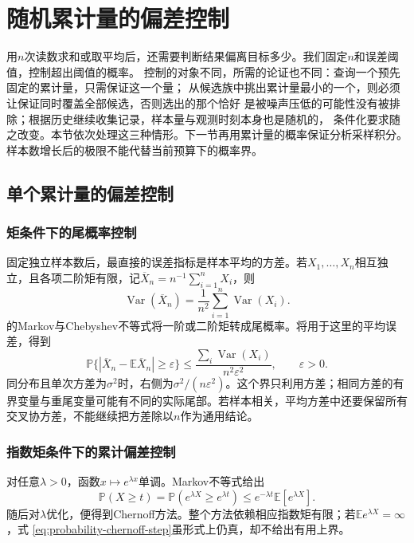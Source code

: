 \section{随机累计量的偏差控制}
\label{sec:probability-averages-errors}
\label{sec:rv-aggregation}
用\(n\)次读数求和或取平均后，还需要判断结果偏离目标多少。我们固定\(n\)和误差阈值，控制超出阈值的概率。
控制的对象不同，所需的论证也不同：查询一个预先固定的累计量，只需保证这一个量；
从候选族中挑出累计量最小的一个，则必须让保证同时覆盖全部候选，否则选出的那个恰好
是被噪声压低的可能性没有被排除；根据历史继续收集记录，样本量与观测时刻本身也是随机的，
条件化要求随之改变。本节依次处理这三种情形。下一节再用累计量的概率保证分析采样积分。
样本数增长后的极限不能代替当前预算下的概率界。

\subsection{单个累计量的偏差控制}
\label{sec:probability-basic-tail-bounds}
\label{sec:probability-concentration-inequalities}
\subsubsection{矩条件下的尾概率控制}
固定独立样本数后，最直接的误差指标是样本平均的方差。若\(X_1,\ldots,X_n\)相互独立，且各项二阶矩有限，记\(\overline X_n=n^{-1}\sum_{i=1}^nX_i\)，则
\[
 \operatorname{Var}(\overline X_n)
 =\frac1{n^2}\sum_{i=1}^n\operatorname{Var}(X_i).
\]
的Markov与Chebyshev不等式将一阶或二阶矩转成尾概率。将用于这里的平均误差，得到
\[
 \mathbb P\{|\overline X_n-\mathbb E\overline X_n|\geq\varepsilon\}
 \leq\frac{\sum_i\operatorname{Var}(X_i)}{n^2\varepsilon^2},
 \qquad\varepsilon>0.
\]
同分布且单次方差为\(\sigma^2\)时，右侧为\(\sigma^2/(n\varepsilon^2)\)。这个界只利用方差；相同方差的有界变量与重尾变量可能有不同的实际尾部。若样本相关，平均方差中还要保留所有交叉协方差，不能继续把方差除以\(n\)作为通用结论。

\subsubsection{指数矩条件下的累计偏差控制}
对任意\(\lambda>0\)，函数\(x\mapsto e^{\lambda x}\)单调。Markov不等式给出
\begin{equation}
  \mathbb{P}(X\geq t)
  =
  \mathbb{P}(e^{\lambda X}\geq e^{\lambda t})
  \leq
  e^{-\lambda t}\mathbb{E}[e^{\lambda X}].
  \label{eq:probability-chernoff-step}
\end{equation}
随后对\(\lambda\)优化，便得到Chernoff方法。整个方法依赖相应指数矩有限；若\(\mathbb{E}e^{\lambda X}=\infty\)，式
\eqref{eq:probability-chernoff-step}虽形式上仍真，却不给出有用上界。

